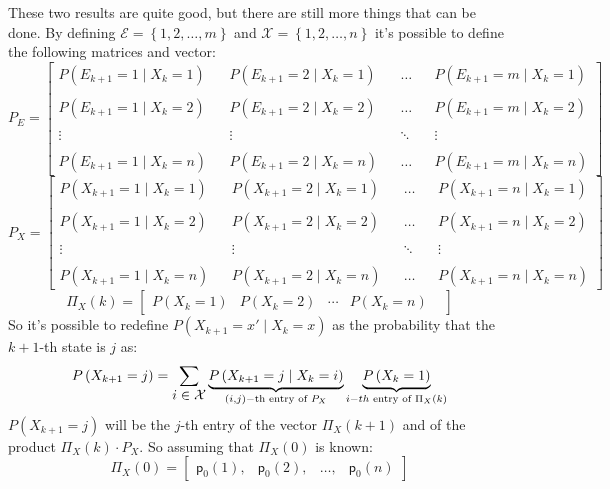 \documentclass[12pt,a4paper]{article}
\newcommand*{\transp}{\mathsf{p}}
\begin{document}
These two results are quite good, but there are still more things that can be done. By defining 
$\mathcal{E}=\left\lbrace 1,2,\dots,m \right\rbrace$ and 
$\mathcal{X}=\left\lbrace 1,2,\dots,n \right\rbrace$
it's possible to define the following matrices and vector:
$$
P_E=
\left[
\begin{matrix}
P\left(E_{k+1}=1  \mid  X_k=1\right)&&
P\left(E_{k+1}=2  \mid  X_k=1\right)&&
\dots&&
P\left(E_{k+1}=m  \mid  X_k=1\right)\\\\
P\left(E_{k+1}=1  \mid  X_k=2\right)&&
P\left(E_{k+1}=2  \mid  X_k=2\right)&&
\dots&&
P\left(E_{k+1}=m  \mid  X_k=2\right)\\\\
\vdots&&
\vdots&&
\ddots&&
\vdots\\\\
P\left(E_{k+1}=1  \mid  X_k=n\right)&&
P\left(E_{k+1}=2  \mid  X_k=n\right)&&
\dots&&
P\left(E_{k+1}=m  \mid  X_k=n\right)
\end{matrix}
\right]
$$
\bigskip
$$
P_X=
\left[
\begin{matrix}
P\left(X_{k+1}=1  \mid  X_k=1\right)&&
P\left(X_{k+1}=2  \mid  X_k=1\right)&&
\dots&&
P\left(X_{k+1}=n  \mid  X_k=1\right)\\\\
P\left(X_{k+1}=1  \mid  X_k=2\right)&&
P\left(X_{k+1}=2  \mid  X_k=2\right)&&
\dots&&
P\left(X_{k+1}=n  \mid  X_k=2\right)\\\\
\vdots&&
\vdots&&
\ddots&&
\vdots\\\\
P\left(X_{k+1}=1  \mid  X_k=n\right)&&
P\left(X_{k+1}=2  \mid  X_k=n\right)&&
\dots&&
P\left(X_{k+1}=n  \mid  X_k=n\right)
\end{matrix}
\right]
$$
\bigskip
$$
\Pi_X(k)=
\left[
\begin{matrix}
P(X_k=1)&
P(X_k=2)&
\cdots&
P(X_k=n)&
\end{matrix}
\right]
$$
\bigskip
\noindent
So it's possible to redefine $P(X_{k+1} = x' \mid X_k = x)$ as the probability that the $k+1$-th state is $j$ as:
$$
P\left(X_{k+1}=j\right)=\sum_{\mathlarger{i\in \mathcal{X}}}
{
\underbrace{P\left(X_{k+1}=j  \mid  X_k=i\right)}_{(i,j)-\text{th}\text{ entry of }P_X}
\underbrace{P\left(X_k=1\right)}_{i-th\text{ entry of }\Pi_X(k)}
}
$$ 
$P(X_{k+1} = j)$ will be the $j$-th entry of the vector $\Pi_X(k+1)$ and of the product $\Pi_X(k) \cdot P_X$. 
So assuming that $\Pi_X(0)$ is known:
$$
\Pi_X(0)=
\left[
\begin{matrix}
\transp_0(1),&
\transp_0(2),&
\dots,&
\transp_0(n)
\end{matrix}
\right]
$$
\end{document}
